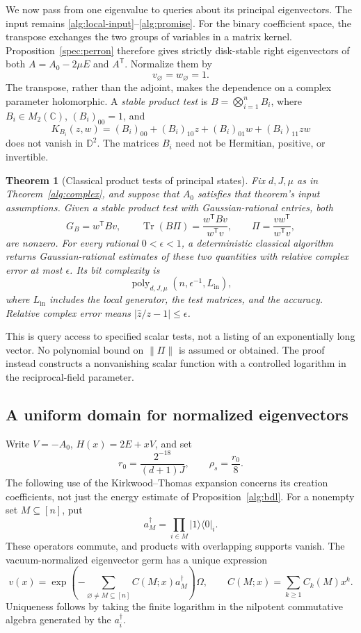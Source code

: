 \documentclass[reqno]{amsart}
\newtheorem{theorem}{Theorem}[section]
\theoremstyle{definition}
\theoremstyle{remark}
\newcommand{\C}{\mathbb C}
\newcommand{\D}{\mathbb D}
\DeclareMathOperator{\Tr}{Tr}
\begin{document}
We now pass from one eigenvalue to queries about its principal
eigenvectors.  The input remains \eqref{alg:local-input}--\eqref{alg:promise}.
For the binary coefficient space, the transpose exchanges the two
groups of variables in a matrix kernel.  Proposition~\ref{spec:perron}
therefore gives strictly disk-stable right eigenvectors of both
\(A=A_0-2\mu E\) and \(A^{\mathsf T}\).  Normalize them by
\[
 v_\varnothing=w_\varnothing=1.
\]
The transpose, rather than the adjoint, makes the dependence on a
complex parameter holomorphic.  A \emph{stable product test} is
\(B=\bigotimes_{i=1}^n B_i\), where \(B_i\in M_2(\C)\),
\((B_i)_{00}=1\), and
\[
 K_{B_i}(z,w)=
 (B_i)_{00}+(B_i)_{10}z+(B_i)_{01}w+(B_i)_{11}zw
\]
does not vanish in \(\D^2\).  The matrices \(B_i\) need not be
Hermitian, positive, or invertible.

\begin{theorem}[Classical product tests of principal states]
\label{alg:product-test}
Fix \(d,J,\mu\) as in Theorem~\ref{alg:complex}, and suppose that
\(A_0\) satisfies that theorem's input assumptions.  Given a stable
product test with Gaussian-rational entries, both
\[
 G_B=w^{\mathsf T}Bv,\qquad
 \Tr(B\Pi)=\frac{w^{\mathsf T}Bv}{w^{\mathsf T}v},
 \qquad \Pi=\frac{vw^{\mathsf T}}{w^{\mathsf T}v},
\]
are nonzero.  For every rational \(0<\epsilon<1\), a deterministic
classical algorithm returns Gaussian-rational estimates of these
two quantities with relative complex error at most \(\epsilon\).
Its bit complexity is
\[
 \operatorname{poly}_{d,J,\mu}
       (n,\epsilon^{-1},L_{\mathrm{in}}),
\]
where \(L_{\mathrm{in}}\) includes the local generator, the test
matrices, and the accuracy.  Relative complex error means
\(|\widehat z/z-1|\le\epsilon\).
\end{theorem}

This is query access to specified scalar tests, not a listing of an
exponentially long vector.  No polynomial bound on \(\|\Pi\|\) is
assumed or obtained.  The proof instead constructs a nonvanishing
scalar function with a controlled logarithm in the reciprocal-field
parameter.

\subsection{A uniform domain for normalized eigenvectors}

Write \(V=-A_0\), \(H(x)=2E+xV\), and set
\begin{equation}\label{alg:state-radii}
 r_0=\frac{2^{-18}}{(d+1)J},\qquad \rho_s=\frac{r_0}{8}.
\end{equation}
The following use of the Kirkwood--Thomas expansion concerns its
creation coefficients, not just the energy estimate of
Proposition~\ref{alg:bdl}.
For a nonempty set \(M\subseteq[n]\), put
\[
 a_M^\dagger=\prod_{i\in M}|1\rangle\langle0|_i .
\]
These operators commute, and products with overlapping supports vanish.
The vacuum-normalized eigenvector germ has a unique expression
\[
 v(x)=\exp\left(-\sum_{\varnothing\ne M\subseteq[n]}
                   C(M;x)a_M^\dagger\right)\Omega,
 \qquad C(M;x)=\sum_{k\ge1}C_k(M)x^k.
\]
Uniqueness follows by taking the finite logarithm in the nilpotent
commutative algebra generated by the \(a_i^\dagger\).
\end{document}
